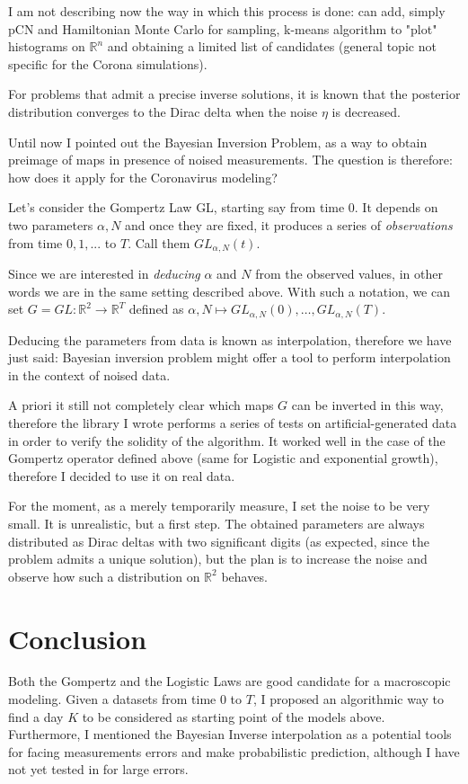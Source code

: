 \documentclass[6pt]{article}
\begin{document}
I am not describing now the way in which this process is done: can add, simply pCN and Hamiltonian Monte Carlo for sampling, k-means algorithm to
"plot" histograms on $\mathbb{R}^n$ and obtaining a limited list of candidates (general topic not specific for the Corona simulations).

For problems that admit a precise inverse solutions, it is known that the posterior distribution converges to the Dirac delta when the noise $\eta$
is decreased.

Until now I pointed out the Bayesian Inversion Problem, as a way to obtain preimage of maps in presence of noised measurements. The question is therefore:
how does it apply for the Coronavirus modeling?

Let's consider the Gompertz Law GL, starting say from time $0$. It depends on two parameters $\alpha, N$ and once they are fixed, it produces a series of
\emph{observations} from time $0, 1,...$ to $T$. Call them $GL_{\alpha, N}(t)$.

Since we are interested in \emph{deducing} $\alpha$ and $N$ from the observed values, in other words we are in the same setting described above.
With such a notation, we can set $G = GL : \mathbb{R}^2 \to \mathbb{R}^T$ defined as
$\alpha, N \mapsto GL_{\alpha, N} (0), \dots, GL_{\alpha, N} (T)$.

Deducing the parameters from data is known as interpolation, therefore we have just said: Bayesian inversion problem might offer a tool to perform interpolation
in the context of noised data.

A priori it still not completely clear which maps $G$ can be inverted in this way, therefore the library I wrote performs a series of tests on artificial-generated
data in order to verify the solidity of the algorithm. It worked well in the case of the Gompertz operator defined above (same for Logistic and exponential growth),
therefore I decided to use it on real data.

For the moment, as a merely temporarily measure, I set the noise to be very small. It is unrealistic, but a first step.
The obtained parameters are always distributed as Dirac deltas with two significant digits 
(as expected, since the problem admits a unique solution), but the plan is to increase the
noise and observe how such a distribution on $\mathbb{R}^2$ behaves.

\section {Conclusion}
Both the Gompertz and the Logistic Laws are good candidate for a macroscopic modeling. Given a datasets from time $0$ to $T$, I proposed an algorithmic way
to find a day $K$ to be considered as starting point of the models above. Furthermore, I mentioned the Bayesian Inverse interpolation as a potential tools for
facing measurements errors and make probabilistic prediction, although I have not yet tested in for large errors.
\end{document}
